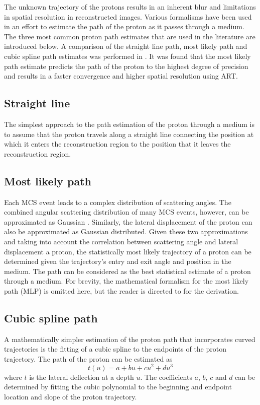 \documentclass[11pt,a4paper]{article}
\begin{document}
The unknown trajectory of the protons results in an inherent blur and limitations in spatial resolution in reconstructed images. Various formalisms have been used in an effort to estimate the path of the proton as it passes through a medium. The three most common proton path estimates that are used in the literature are introduced below. A comparison of the straight line path, most likely path and cubic spline path estimates was performed in \cite{li2006reconstruction}. It was found that the most likely path estimate predicts the path of the proton to the highest degree of precision and results in a faster convergence and higher spatial resolution using ART. 

\subsection{Straight line}
The simplest approach to the path estimation of the proton through a medium is to assume that the proton travels along a straight line connecting the position at which it enters the reconstruction region to the position that it leaves the reconstruction region.

\subsection{Most likely path}
\label{sec:appmlp}
Each MCS event leads to a complex distribution of scattering angles. The combined angular scattering distribution of many MCS events, however, can be approximated as Gaussian \cite{eyges1948multiple}. Similarly, the lateral displacement of the proton can also be approximated as Gaussian distributed. Given these two approximations and taking into account the correlation between scattering angle and lateral displacement a proton, the statistically most likely trajectory of a proton can be determined given the trajectory's entry and exit angle and position in the medium. The path can be considered as the best statistical estimate of a proton through a medium. For brevity, the mathematical formalism for the most likely path (MLP) is omitted here, but the reader is directed to \cite{williams2004most,schulte2008maximum} for the derivation. 


\subsection{Cubic spline path}
\label{sec:spline}
A mathematically simpler estimation of the proton path that incorporates curved trajectories is the fitting of a cubic spline to the endpoints of the proton trajectory. The path of the proton can be estimated as 
\begin{equation}
t(u) = a + b u + c u^2 + d u^3
\end{equation}
where $t$ is the lateral deflection at a depth $u$. The coefficients $a$, $b$, $c$ and $d$ can be determined by fitting the cubic polynomial to the beginning and endpoint location and slope of the proton trajectory.
\end{document}
